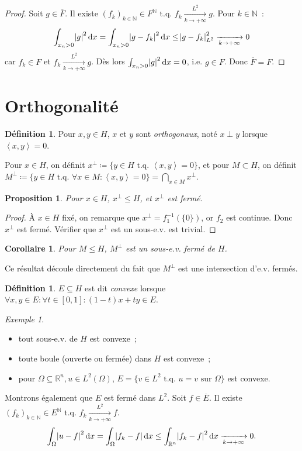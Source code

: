 \documentclass{report}
\newcommand{\R}{{\mathbb R}}
\newcommand{\N}{{\mathbb N}}
\newcommand{\scpr}[2]{\left\langle#1, #2\right\rangle}
\newcommand{\tq}{\text{ t.q. }}
\newcommand{\pinfty}{{+\infty}}
\newcommand{\dx}{\dif x}
\newtheorem{prp}[thm]{Proposition}
\newtheorem{cor}[thm]{Corollaire}
\theoremstyle{definition}
\newtheorem{déf}[thm]{Définition}
\theoremstyle{remark}
\newtheorem{ex}{Exemple}[chapter]
\begin{document}
\begin{proof} Soit $g \in \overline F$. Il existe $(f_k)_{k \in \N} \in F^\N \tq f_k \xrightarrow[k \to \pinfty]{L^2} g$. Pour $k \in \N$~:
\[\int_{x_n > 0}\abs g^2\dx = \int_{x_n > 0}\abs {g-f_k}^2\dx \leq \abs {g-f_k}^2_{L^2} \xrightarrow[k \to \pinfty]{} 0\]
car $f_k \in F$ et $f_k \xrightarrow[k \to \pinfty]{L^2} g$. Dès lors $\int_{x_n > 0}\abs g^2\dx = 0$, i.e. $g \in F$. Donc $\overline F = F$.
\end{proof}

\section{Orthogonalité}

\begin{déf} Pour $x, y \in H$, $x$ et $y$ sont \textit{orthogonaux}, noté $x \perp y$ lorsque $\scpr xy = 0$.

Pour $x \in H$, on définit $x^\perp \coloneqq \{y \in H \tq \scpr xy = 0\}$, et pour $M \subset H$, on définit
$M^\perp \coloneqq \{y \in H \tq \forall x \in M : \scpr xy = 0\} = \bigcap_{x \in M}x^\perp$.
\end{déf}

\begin{prp} Pour $x \in H$, $x^\perp \leq H$, et $x^\perp$ est fermé.
\end{prp}

\begin{proof} À $x \in H$ fixé, on remarque que $x^\perp = f_1^{-1}(\{0\})$, or $f_2$ est continue. Donc $x^\perp$ est fermé. Vérifier que $x^\perp$ est un sous-e.v. est trivial.
\end{proof}

\begin{cor} Pour $M \leq H$, $M^\perp$ est un sous-e.v. fermé de $H$.
\end{cor}

Ce résultat découle directement du fait que $M^\perp$ est une intersection d'e.v. fermés.

\begin{déf} $E \subseteq H$ est dit \textit{convexe} lorsque $\forall x, y \in E : \forall t \in [0, 1] : (1-t)x + ty \in E$.
\end{déf}

\begin{ex}~
\begin{itemize}
	\item tout sous-e.v. de $H$ est convexe~;
	\item toute boule (ouverte ou fermée) dans $H$ est convexe~;
	\item pour $\Omega \subseteq \R^n, u \in L^2(\Omega)$, $E = \{v \in L^2 \tq u=v \text{ sur } \Omega\}$ est convexe.
\end{itemize}

Montrons également que $E$ est fermé dans $L^2$. Soit $f \in \overline E$. Il existe $(f_k)_{k \in \N} \in E^\N \tq f_k \xrightarrow[k \to \pinfty]{L^2} f$.
\[\int_\Omega \abs {u-f}^2\dx = \int_\Omega\abs {f_k-f}\dif x \leq \int_{\R^n}\abs {f_k-f}^2\dx \xrightarrow[k \to \pinfty]{} 0.\]
\end{ex}
\end{document}
